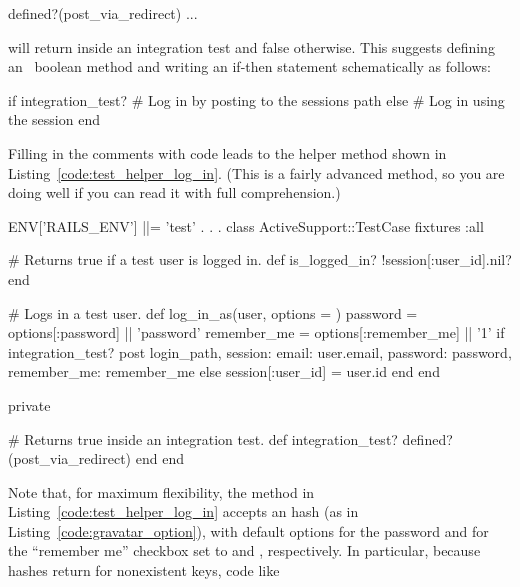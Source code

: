\begin{code}
defined?(post_via_redirect) ...
\end{code}

\noindent will return  inside an integration test and false otherwise. This suggests defining an \ boolean method and writing an if-then statement schematically as follows:

\begin{code}
if integration_test?
  # Log in by posting to the sessions path
else
  # Log in using the session
end
\end{code}

\noindent Filling in the comments with code leads to the  helper method shown in Listing~\ref{code:test_helper_log_in}. (This is a fairly advanced method, so you are doing well if you can read it with full comprehension.)

\begin{codelisting}
\label{code:test_helper_log_in}
\begin{code}
ENV['RAILS_ENV'] ||= 'test'
.
.
.
class ActiveSupport::TestCase
  fixtures :all

  # Returns true if a test user is logged in.
  def is_logged_in?
    !session[:user_id].nil?
  end

  # Logs in a test user.
  def log_in_as(user, options = {})
    password    = options[:password]    || 'password'
    remember_me = options[:remember_me] || '1'
    if integration_test?
      post login_path, session: { email:       user.email,
                                  password:    password,
                                  remember_me: remember_me }
    else
      session[:user_id] = user.id
    end
  end

  private

    # Returns true inside an integration test.
    def integration_test?
      defined?(post_via_redirect)
    end
end
\end{code}
\end{codelisting}

\noindent Note that, for maximum flexibility, the  method in Listing~\ref{code:test_helper_log_in} accepts an  hash (as in Listing~\ref{code:gravatar_option}), with default options for the password and for the ``remember me'' checkbox set to  and , respectively. In particular, because hashes return  for nonexistent keys, code like

